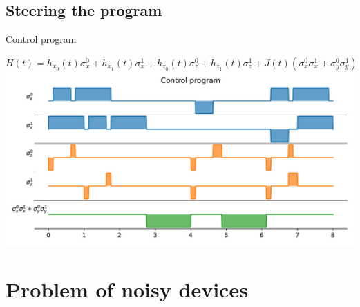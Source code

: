 \subsection{Steering the program}
\begin{frame}{Control program}
	\begin{center}
		$H(t) = h_{x_0}(t)\sigma_x^0+
			h_{x_1}(t)\sigma_x^1+
			h_{z_0}(t)\sigma_z^0+
			h_{z_1}(t)\sigma_z^1+
			J(t)\left(\sigma_x^0\sigma_x^{1} + \sigma_y^0\sigma_y^{1}\right)$\\[0.5cm]
		\includegraphics[height=0.55\textheight]{../src/control.pdf}
	\end{center}
\end{frame}
\section{Problem of noisy devices}
